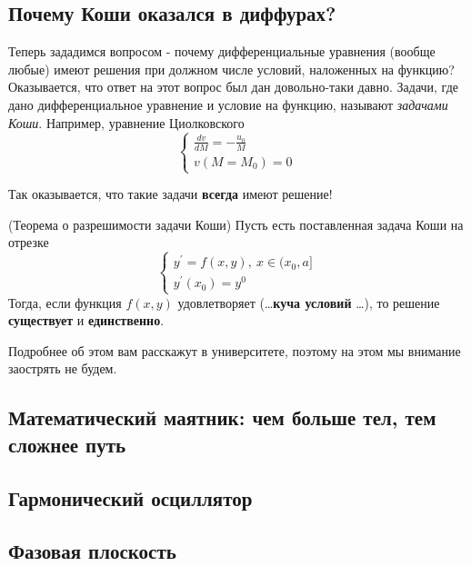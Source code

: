\subsection{Почему Коши оказался в диффурах?}
Теперь зададимся вопросом - почему дифференциальные уравнения (вообще любые) имеют решения при должном числе условий, наложенных на функцию? Оказывается, что ответ на этот вопрос был дан довольно-таки давно. Задачи, где дано дифференциальное уравнение и условие на функцию, называют \textit{задачами Коши}. Например, уравнение Циолковского
\begin{equation*}
    \begin{cases}
        \frac{dv}{dM}= - \frac{u_0}{M}\\
        v(M = M_0) = 0
    \end{cases}
\end{equation*}

Так оказывается, что такие задачи \textbf{всегда} имеют решение!
\begin{theorem}(Теорема о разрешимости задачи Коши)
    Пусть есть поставленная задача Коши на отрезке
    \begin{equation*}
        \begin{cases}
            y^{'} = f(x,y),\ x \in (x_0, a]\\
            y^{'}(x_0) = y^{0}
        \end{cases}
    \end{equation*}
    Тогда, если функция $f(x,y)$ удовлетворяет (\dots \textbf{куча условий} \dots), то решение \textbf{существует} и \textbf{единственно}.
\end{theorem}
Подробнее об этом вам расскажут в университете, поэтому на этом мы внимание заострять не будем.
\subsection{Математический маятник: чем больше тел, тем сложнее путь}

\subsection{Гармонический осциллятор}
\subsection{Фазовая плоскость}